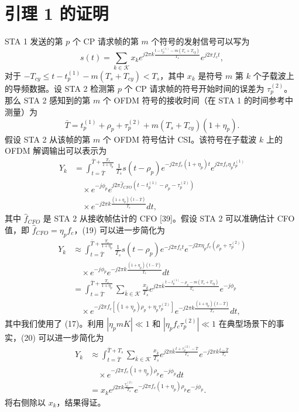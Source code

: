 \documentclass[journal]{IEEEtran}
\begin{document}
\section{引理 1 的证明}
STA 1 发送的第 $p$ 个 CP 请求帧的第 $m$ 个符号的发射信号可以写为
\begin{equation}
s(t) = \sum_{k \in \mathcal{K}} x_k e^{j2\pi k \frac{t - t_p^{(1)} - m(T_s + T_{cy})}{T_s}} e^{j2\pi f_c t}, \label{eq:17}
\end{equation}
对于 $-T_{cy} \le t - t_p^{(1)} - m(T_s + T_{cy}) < T_s$，其中 $x_k$ 是符号 $m$ 第 $k$ 个子载波上的导频数据。设 STA 2 检测第 $p$ 个 CP 请求帧的符号开始时间的误差为 $\tau_p^{(2)}$。那么 STA 2 感知到的第 $m$ 个 OFDM 符号的接收时间（在 STA 1 的时间参考中测量）为
\begin{equation}
\bar{T} = t_p^{(1)} + \rho_p + \tau_p^{(2)} + m(T_s + T_{cy})(1 + \eta_p). \label{eq:18}
\end{equation}
假设 STA 2 从该帧的第 $m$ 个 OFDM 符号估计 CSI。该符号在子载波 $k$ 上的 OFDM 解调输出可以表示为
\begin{align}
Y_k &= \int_{t=\bar{T}}^{\bar{T} + \frac{T_s}{1+\eta_p}} \frac{1}{T_s} s(t - \rho_p) e^{-j2\pi f_c(1+\eta_p)t} e^{j2\pi f_c \eta_p t_p^{(1)}} \nonumber \\
&\quad \times e^{-j\phi_p} e^{j2\pi \hat{f}_{CFO}(t - t_p^{(1)} - \rho_p - \tau_p^{(2)})} \nonumber \\
&\quad \times e^{-j2\pi k \frac{(1+\eta_p)(t-\bar{T})}{T_s}} dt, \label{eq:19}
\end{align}
其中 $\hat{f}_{CFO}$ 是 STA 2 从接收帧估计的 CFO [39]。假设 STA 2 可以准确估计 CFO 值，即 $\hat{f}_{CFO} = \eta_p f_c$，(19) 可以进一步简化为
\begin{align}
Y_k &\approx \int_{t=\bar{T}}^{\bar{T} + \frac{T_s}{1+\eta_p}} \frac{1}{T_s} s(t - \rho_p) e^{-j2\pi f_c t} e^{-j2\pi \eta_p f_c(\rho_p + \tau_p^{(2)})} \nonumber \\
&\quad \times e^{-j\phi_p} e^{-j2\pi k \frac{(1+\eta_p)(t-\bar{T})}{T_s}} dt \nonumber \\
&= \int_{t=\bar{T}}^{\bar{T} + \frac{T_s}{1+\eta_p}} \sum_{\bar{k} \in \mathcal{K}} \frac{x_{\bar{k}}}{T_s} e^{j2\pi \bar{k} \frac{t - t_p^{(1)} - \rho_p - m(T_s + T_{cy})}{T_s}} e^{-j\phi_p} \nonumber \\
&\quad \times e^{-j2\pi f_c [(1+\eta_p)\rho_p + \eta_p \tau_p^{(2)}]} e^{-j2\pi k \frac{(1+\eta_p)(t-\bar{T})}{T_s}} dt, \label{eq:20}
\end{align}
其中我们使用了 (17)。利用 $|\eta_p m K| \ll 1$ 和 $|\eta_p f_c \tau_p^{(2)}| \ll 1$ 在典型场景下的事实，(20) 可以进一步简化为
\begin{align}
Y_k &\approx \int_{t=\bar{T}}^{\bar{T} + T_s} \sum_{\bar{k} \in \mathcal{K}} \frac{x_{\bar{k}}}{T_s} e^{j2\pi \bar{k} \frac{t + \tau_p^{(2)} - \bar{T}}{T_s}} e^{-j2\pi k \frac{t - \bar{T}}{T_s}} \nonumber \\
&\quad \times e^{-j2\pi f_c(1+\eta_p)\rho_p} e^{-j\phi_p} dt \nonumber \\
&= x_k e^{j2\pi k \frac{\tau_p^{(2)}}{T_s}} e^{-j2\pi f_c(1+\eta_p)\rho_p} e^{-j\phi_p}. \label{eq:21}
\end{align}
将右侧除以 $x_k$，结果得证。
\end{document}
